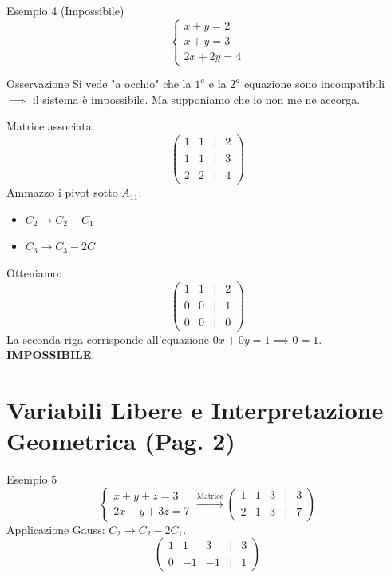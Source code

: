 \begin{example}{Esempio 4 (Impossibile)}{}
\[
\begin{cases}
x+y=2 \\
x+y=3 \\
2x+2y=4
\end{cases}
\]
\begin{note}{Osservazione}{}
Si vede "a occhio" che la $1^a$ e la $2^a$ equazione sono incompatibili $\implies$ il sistema è impossibile.
Ma supponiamo che io non me ne accorga.
\end{note}

Matrice associata:
\[
\begin{pmatrix}
1 & 1 & | & 2 \\
1 & 1 & | & 3 \\
2 & 2 & | & 4
\end{pmatrix}
\]
Ammazzo i pivot sotto $A_{11}$:
\begin{itemize}
    \item $C_2 \to C_2 - C_1$
    \item $C_3 \to C_3 - 2C_1$
\end{itemize}
Otteniamo:
\[
\begin{pmatrix}
1 & 1 & | & 2 \\
0 & 0 & | & 1 \\
0 & 0 & | & 0
\end{pmatrix}
\]
La seconda riga corrisponde all'equazione $0x + 0y = 1 \implies 0=1$. \textbf{IMPOSSIBILE}.
\end{example}

\section{Variabili Libere e Interpretazione Geometrica (Pag. 2)}

\begin{example}{Esempio 5}{}
\[
\begin{cases}
x+y+z=3 \\
2x+y+3z=7
\end{cases}
\xrightarrow{\text{Matrice}}
\begin{pmatrix} 1 & 1 & 3 & | & 3 \\ 2 & 1 & 3 & | & 7 \end{pmatrix}
\]
Applicazione Gauss: $C_2 \to C_2 - 2C_1$.
\[
\begin{pmatrix} 1 & 1 & 3 & | & 3 \\ 0 & -1 & -1 & | & 1 \end{pmatrix}
\]
\end{example}

